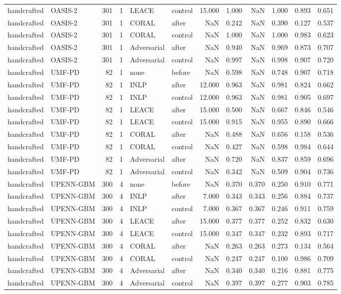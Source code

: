 \begin{tabular}{llrrllrrrrrr}
handcrafted & OASIS-2 & 301 & 1 & LEACE & control & 15.000 & 1.000 & NaN & 1.000 & 0.893 & 0.651 \\
handcrafted & OASIS-2 & 301 & 1 & CORAL & after & NaN & 0.242 & NaN & 0.390 & 0.127 & 0.537 \\
handcrafted & OASIS-2 & 301 & 1 & CORAL & control & NaN & 1.000 & NaN & 1.000 & 0.983 & 0.623 \\
handcrafted & OASIS-2 & 301 & 1 & Adversarial & after & NaN & 0.940 & NaN & 0.969 & 0.873 & 0.707 \\
handcrafted & OASIS-2 & 301 & 1 & Adversarial & control & NaN & 0.997 & NaN & 0.998 & 0.907 & 0.720 \\
handcrafted & UMF-PD & 82 & 1 & none & before & NaN & 0.598 & NaN & 0.748 & 0.907 & 0.718 \\
handcrafted & UMF-PD & 82 & 1 & INLP & after & 12.000 & 0.963 & NaN & 0.981 & 0.824 & 0.662 \\
handcrafted & UMF-PD & 82 & 1 & INLP & control & 12.000 & 0.963 & NaN & 0.981 & 0.905 & 0.697 \\
handcrafted & UMF-PD & 82 & 1 & LEACE & after & 15.000 & 0.500 & NaN & 0.667 & 0.846 & 0.546 \\
handcrafted & UMF-PD & 82 & 1 & LEACE & control & 15.000 & 0.915 & NaN & 0.955 & 0.890 & 0.666 \\
handcrafted & UMF-PD & 82 & 1 & CORAL & after & NaN & 0.488 & NaN & 0.656 & 0.158 & 0.536 \\
handcrafted & UMF-PD & 82 & 1 & CORAL & control & NaN & 0.427 & NaN & 0.598 & 0.984 & 0.644 \\
handcrafted & UMF-PD & 82 & 1 & Adversarial & after & NaN & 0.720 & NaN & 0.837 & 0.859 & 0.696 \\
handcrafted & UMF-PD & 82 & 1 & Adversarial & control & NaN & 0.342 & NaN & 0.509 & 0.904 & 0.736 \\
handcrafted & UPENN-GBM & 300 & 4 & none & before & NaN & 0.370 & 0.370 & 0.250 & 0.910 & 0.771 \\
handcrafted & UPENN-GBM & 300 & 4 & INLP & after & 7.000 & 0.343 & 0.343 & 0.256 & 0.884 & 0.737 \\
handcrafted & UPENN-GBM & 300 & 4 & INLP & control & 7.000 & 0.367 & 0.367 & 0.246 & 0.911 & 0.759 \\
handcrafted & UPENN-GBM & 300 & 4 & LEACE & after & 15.000 & 0.377 & 0.377 & 0.252 & 0.832 & 0.630 \\
handcrafted & UPENN-GBM & 300 & 4 & LEACE & control & 15.000 & 0.347 & 0.347 & 0.232 & 0.893 & 0.717 \\
handcrafted & UPENN-GBM & 300 & 4 & CORAL & after & NaN & 0.263 & 0.263 & 0.273 & 0.134 & 0.564 \\
handcrafted & UPENN-GBM & 300 & 4 & CORAL & control & NaN & 0.247 & 0.247 & 0.100 & 0.986 & 0.709 \\
handcrafted & UPENN-GBM & 300 & 4 & Adversarial & after & NaN & 0.340 & 0.340 & 0.216 & 0.881 & 0.775 \\
handcrafted & UPENN-GBM & 300 & 4 & Adversarial & control & NaN & 0.397 & 0.397 & 0.277 & 0.903 & 0.785 \\
\bottomrule
\end{tabular}

